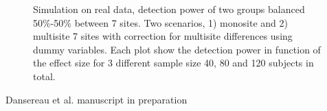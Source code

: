 \documentclass[authoryear]{elsarticle}
\begin{document}
\begin{figure}
\centering
\captionsetup[subfloat]{labelformat=empty}
\hspace{1mm}
\hspace{1mm}
\hspace{1mm}
\tiny Simulation on real data, detection power of two groups balanced 50\%-50\% between 7 sites. Two scenarios, 1) monosite and 2) multisite 7 sites with correction for multisite differences using dummy variables. Each plot show the detection power in function of the effect size for 3 different sample size 40, 80 and 120 subjects in total.
\end{figure}
\tiny Dansereau et al. manuscript in preparation
\end{document}
